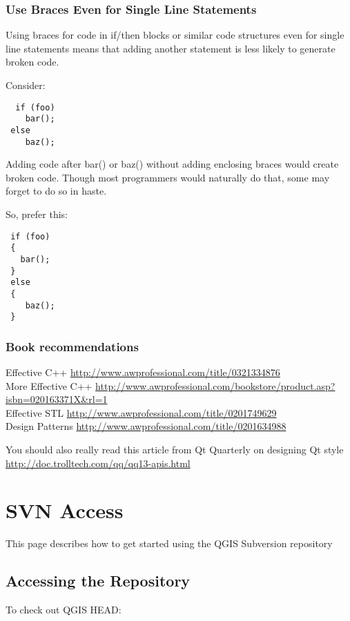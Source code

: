 \subsubsection{Use Braces Even for Single Line Statements}
Using braces for code in if/then blocks or similar code structures even for single line statements means that adding another 
statement is less likely to generate broken code.

Consider:

\begin{verbatim}
  if (foo)
    bar();
 else
    baz();
\end{verbatim}

Adding code after bar() or baz() without adding enclosing braces would create broken code.  Though most programmers would 
naturally do that, some may forget to do so in haste.

So, prefer this:

\begin{verbatim}
 if (foo)
 {
   bar();
 }
 else
 { 
    baz();
 } 
\end{verbatim}

\subsubsection{Book recommendations}

Effective C++ \url{http://www.awprofessional.com/title/0321334876} \\
More Effective C++ \url{http://www.awprofessional.com/bookstore/product.asp?isbn=020163371X&rl=1} \\
Effective STL \url{http://www.awprofessional.com/title/0201749629} \\
Design Patterns \url{http://www.awprofessional.com/title/0201634988}

You should also really read this article from Qt Quarterly on designing Qt style
\url{http://doc.trolltech.com/qq/qq13-apis.html}

\section{SVN Access}
This page describes how to get started using the QGIS Subversion repository

\subsection{Accessing the Repository}
To check out QGIS HEAD:

